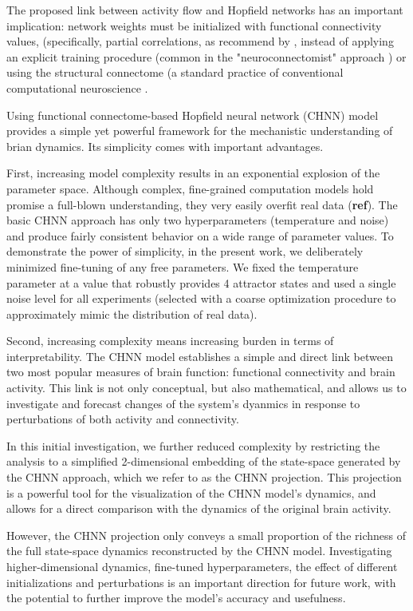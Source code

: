\documentclass{article}
\begin{document}
The proposed link between activity flow and Hopfield networks has an important implication: network weights must be
initialized with functional connectivity values, (specifically, partial correlations, as recommend by
\citep{cole2016activity}, instead of applying an explicit training procedure (common in the "neuroconnectomist"
approach \citep{doerig2023neuroconnectionist}) or using the structural connectome (a standard practice of conventional
computational neuroscience \citep{cabral2017functional}.

Using functional connectome-based Hopfield  neural network (CHNN) model provides a simple yet powerful framework for the mechanistic
understanding of brian dynamics. Its simplicity comes with important advantages.

First, increasing model complexity results in an exponential explosion of the parameter space. Although complex,
fine-grained computation models hold promise a full-blown understanding, they very easily overfit real data (\textbf{ref}).
The basic CHNN approach has only two hyperparameters (temperature and noise) and produce fairly consistent behavior on a
wide range of parameter values. To demonstrate the power of simplicity, in the present work, we deliberately minimized
fine-tuning of any free parameters. We fixed the temperature parameter at a value that robustly provides 4 attractor
states and used a single noise level for all experiments (selected with a coarse optimization procedure to approximately
mimic the distribution of real data).

Second, increasing complexity means increasing burden in terms of interpretability. The CHNN model establishes a simple
and direct link between two most popular measures of brain function: functional connectivity and brain activity. This
link is not only conceptual, but also mathematical, and allows us to investigate and forecast changes of the system's
dyanmics in response to perturbations of both activity and connectivity.

In this initial investigation, we further reduced complexity by restricting the analysis to a simplified 2-dimensional
embedding of the state-space generated by the CHNN approach, which we refer to as the CHNN projection. This
projection is a powerful tool for the visualization of the CHNN model's dynamics, and allows for a direct comparison
with the dynamics of the original brain activity.

However, the CHNN projection only conveys a small proportion of the richness of the full state-space dynamics
reconstructed by the CHNN model. Investigating higher-dimensional dynamics, fine-tuned hyperparameters, the effect of
different initializations and perturbations is an important direction for future work, with the potential to further
improve the model's accuracy and usefulness.
\end{document}
